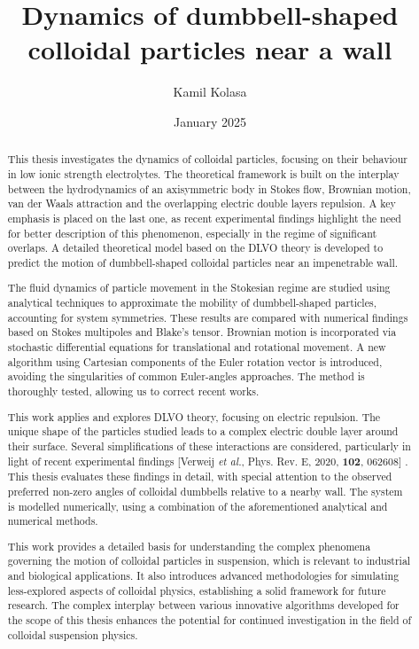\documentclass{master_thesis}
\author{Kamil Kolasa}
\title{Dynamics of dumbbell-shaped colloidal particles near a wall}
\date{January 2025}
\begin{document}
    \maketitle
    \let\cleardoublepage\clearpage
    
\begin{abstract}

This thesis investigates the dynamics of colloidal particles, focusing on their behaviour in low ionic strength electrolytes. The theoretical framework is built on the interplay between the hydrodynamics of an axisymmetric body in Stokes flow, Brownian motion, van der Waals attraction and the overlapping electric double layers repulsion. A key emphasis is placed on the last one, as recent experimental findings highlight the need for better description of this phenomenon, especially in the regime of significant overlaps. A detailed theoretical model based on the DLVO theory is developed to predict the motion of dumbbell-shaped colloidal particles near an impenetrable wall.

The fluid dynamics of particle movement in the Stokesian regime are studied using analytical techniques to approximate the mobility of dumbbell-shaped particles, accounting for system symmetries. These results are compared with numerical findings based on Stokes multipoles and Blake’s tensor. Brownian motion is incorporated via stochastic differential equations for translational and rotational movement. A new algorithm using Cartesian components of the Euler rotation vector is introduced, avoiding the singularities of common Euler-angles approaches. The method is thoroughly tested, allowing us to correct recent works.

This work applies and explores DLVO theory, focusing on electric repulsion. The unique shape of the particles studied leads to a complex electric double layer around their surface. Several simplifications of these interactions are considered, particularly in light of recent experimental findings [Verweij \textit{et al.}, Phys. Rev. E, 2020, {\bf 102}, 062608] \nocite{verweij2021}. This thesis evaluates these findings in detail, with special attention to the observed preferred non-zero angles of colloidal dumbbells relative to a nearby wall. The system is modelled numerically, using a combination of the aforementioned analytical and numerical methods.

This work provides a detailed basis for understanding the complex phenomena governing the motion of colloidal particles in suspension, which is relevant to industrial and biological applications. It also introduces advanced methodologies for simulating less-explored aspects of colloidal physics, establishing a solid framework for future research. The complex interplay between various innovative algorithms developed for the scope of this thesis enhances the potential for continued investigation in the field of colloidal suspension physics.

\end{abstract}
\end{document}
